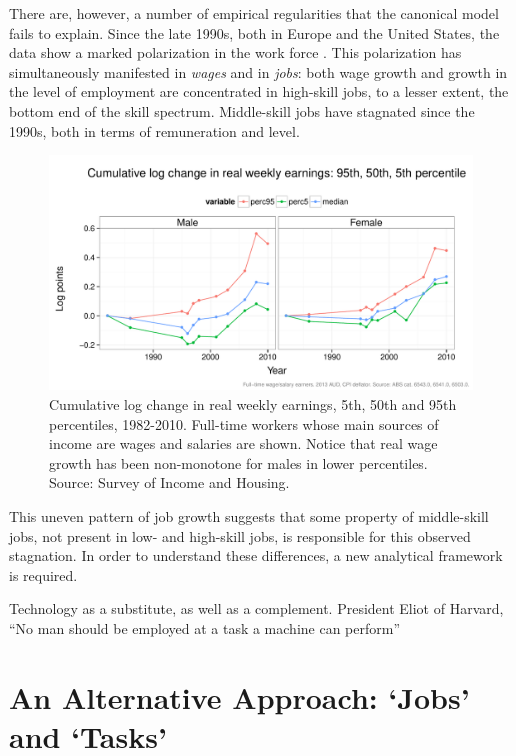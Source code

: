\documentclass[a4paper,11pt]{article}
\begin{document}
There are, however, a number of empirical regularities that the canonical model fails to explain. Since the late 1990s, both in Europe and the United States, the data show a marked polarization in the work force \citep{Goos2007, Autor2006}. This polarization has simultaneously manifested in \emph{wages} and in \emph{jobs}: both wage growth and growth in the level of employment are concentrated in high-skill jobs, to a lesser extent, the bottom end of the skill spectrum. Middle-skill jobs have stagnated since the 1990s, both in terms of remuneration and level.

\begin{figure}
  \centering
  \includegraphics[width=\textwidth]{../figure/wage_change_time.pdf}
  \caption{Cumulative log change in real weekly earnings, 5th, 50th and 95th percentiles, 1982-2010. Full-time workers whose main sources of income are wages and salaries are shown. Notice that real wage growth has been non-monotone for males in lower percentiles. Source: Survey of Income and Housing.}
  \label{fig:changetime}
\end{figure}

This uneven pattern of job growth suggests that some property of middle-skill jobs, not present in low- and high-skill jobs, is responsible for this observed stagnation. In order to understand these differences, a new analytical framework is required.

Technology as a substitute, as well as a complement. President Eliot of Harvard, ``No man should be employed at a task a machine can perform'' \cite{Nordhaus2007}

\section{An Alternative Approach: `Jobs' and `Tasks'}
\end{document}
